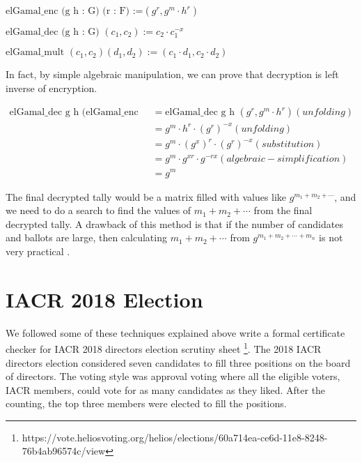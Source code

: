\begin{displayquote}
$\text{elGamal\_enc (g h : G) (r : F) :=} (g^r, g^m \cdot h^r)$

$\text{elGamal\_dec (g h : G) }  (c_{1}, c_{2}) := c_{2} \cdot c_{1}^{-x}$

$\text{elGamal\_mult } (c_{1}, c_{2}) (d_{1}, d_{2}) := (c_{1} \cdot d_{1}, c_{2} \cdot d_{2})$

\end{displayquote}

\noindent
In fact, by simple algebraic manipulation, we can prove that 
decryption is left inverse of encryption. 


\begin{align}
  \text{elGamal\_dec g h (elGamal\_enc g h r)} &= \text{elGamal\_dec g h } (g^r, g^m \cdot h^r)  (unfolding) \nonumber \\
                     &= g^m \cdot h^r \cdot (g^r)^{-x}  (unfolding) \nonumber \\
                     &= g^m \cdot (g^x)^r \cdot (g^r)^{-x} (substitution) \nonumber \\
                     &=  g^m \cdot g^{xr} \cdot g^{-rx} (algebraic-simplification)\nonumber \\
                     &= g^m\nonumber 
\end{align}


\noindent 
The final decrypted tally would be a matrix filled with values like $g^{m_{1} + m_{2} + \cdots }$, and we 
need to do a search to find the values of $m_{1} + m_{2} + \cdots$ from the 
final decrypted tally. A drawback of this method is that if the number of candidates and ballots are
 large, then calculating $m_{1} + m_{2} + \cdots$ from 
	      $g^{m_{1} + m_{2} + \dotsb  + m_{n}}$ is 
	      not very practical \citep{10.1007/3-540-69053-0_9}.  


\section{IACR 2018 Election}
\label{sec:election_iacr}
We followed some of these techniques explained above write a formal 
certificate checker for  IACR 2018 directors election scrutiny sheet
\footnote{https://vote.heliosvoting.org/helios/elections/60a714ea-ce6d-11e8-8248-76b4ab96574c/view}.  
The 2018  IACR directors election considered seven 
 candidates to fill three positions on the board of directors.   The voting 
 style was approval voting where all the eligible voters, IACR members, 
 could vote for as many candidates as they liked. After the counting, 
 the top three members were elected to fill the positions. 
 
